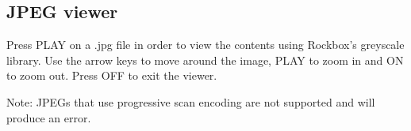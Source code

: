 \subsection{JPEG viewer}
Press PLAY on a .jpg file in order to view the contents using Rockbox's greyscale library.  Use the arrow keys to move around the image, PLAY to zoom in
and ON to zoom out.  Press OFF to exit the viewer.

Note: JPEGs that use progressive scan encoding are not supported and will produce an error.


